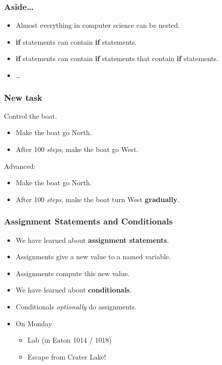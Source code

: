 \documentclass{beamer}
\begin{document}
\begin{frame}[fragile]
\frametitle{Aside\ldots}

\begin{itemize}
\item Almost everything in computer science can be nested.
\item {\bf if} statements can contain {\bf if} statements.
\item {\bf if} statements can contain {\bf if} statements that
contain {\bf if} statements.
\item \ldots
\end{itemize}

\end{frame}

\begin{frame}[fragile]
\frametitle{New task}

Control the boat.
\begin{itemize}
\item Make the boat go North.
\item After 100 {\em steps\/}, make the boat go West.
\end{itemize}

\frameskip

Advanced:
\begin{itemize}
\item Make the boat go North.
\item After 100 {\em steps\/}, make the boat turn West {\bf gradually}.
\end{itemize}
\end{frame}


\begin{frame}[fragile]
\frametitle{Assignment Statements and Conditionals}
\Large
\begin{itemize}
\item We have learned about {\bf assignment statements}.
\item Assignments give a new value to a named variable.
\item Assignments compute this new value.
\frameskip
\frameskip{}
\item We have learned about {\bf conditionals}.
\item Conditionals {\em optionally\/} do assignments.
\frameskip{}
\frameskip{}
\item On Monday 
\begin{itemize}
\Large
\item Lab (in Eaton 1014 / 1018)
\item Escape from Crater Lake!
\end{itemize}
\end{itemize}

\end{frame}
\end{document}
